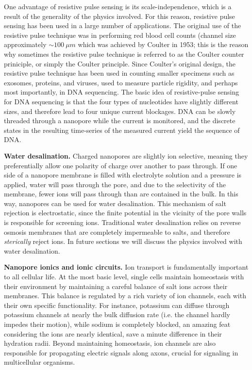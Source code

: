 \documentclass[a4paper,10pt]{article}
\theoremstyle{definition}
\theoremstyle{remark}
\begin{document}
One advantage of resistive pulse sensing is its scale-independence, which is a result of the generality of the physics involved. For this reason, resistive pulse sensing has been used in a large number of applications. The original use of the resistive pulse technique was in performing red blood cell counts (channel size approximately $\sim\SI{100}{\mu m}$ which was achieved by Coulter in 1953; this is the reason why sometimes the resistive pulse technique is referred to as the Coulter counter priniciple, or simply the Coulter principle. Since Coulter's original design, the resistive pulse technique has been used in counting smaller specimens such as exosomes, proteins, and viruses, used to measure particle rigidity, and perhaps most importantly, in DNA sequencing. The basic idea of resistive-pulse sensing for DNA sequencing is that the four types of nucleotides have slightly different sizes, and therefore lead to four unique current blockages. DNA can be slowly threaded through a nanopore while the current is monitored, and the discrete states in the resulting time-series of the measured current yield the sequence of DNA.

\textbf{Water desalination.} Charged nanopores are slightly ion selective, meaning they preferentially allow one polarity of charge over another to pass through. If one side of a nanopore membrane is filled with electrolyte solution and a pressure is applied, water will pass through the pore, and due to the selectivity of the membrane, fewer ions will pass through than are contained in the bulk. In this way, nanopores can be used for water desalination. This mechanism of salt rejection is electrostatic, since the finite potential in the vicinity of the pore walls is responsible for screening ions. Traditional water desalination relies on reverse osmosis membranes that are completely impermeable to salts, and therefore \textit{sterically} reject ions.  In future sections we will discuss the physics involved with water desalination.

\textbf{Nanopore ionics and ionic circuits.} Ion transport is fundamentally important to all cellular life. At the most basic level, single cells maintain homeostasis with their environment by maintaining a careful balance of salt ions across their membranes. This balance is regulated by a rich variety of ion channels, each with their own specific functionality. For instance, potassium can diffuse through potassium channels at nearly the bulk diffusion rate (i.e. the channel hardly impedes their motion), while sodium is completely blocked, an amazing feat considering the ions are nearly identical, save a minute difference in their hydration radii. Beyond maintaining homeostasis, ion channels are also responsible for propagating electric signals along axons, crucial for signaling in multicellular organisms. 
\end{document}
